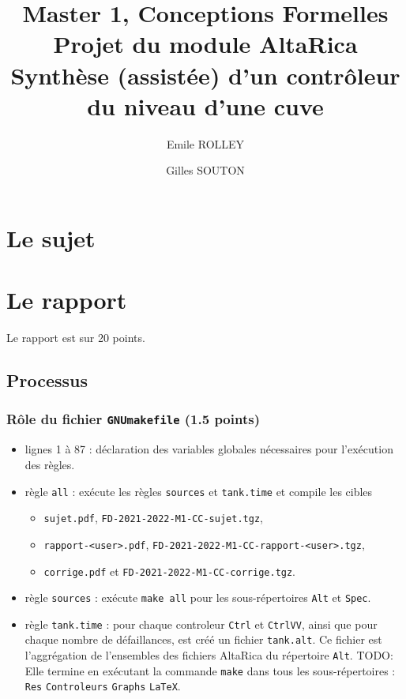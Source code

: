 \documentclass[a4paper]{book}
\newcommand{\altarica}{{\sc AltaRica}}
\begin{document}
\title{Master 1, Conceptions Formelles\\
Projet du module \altarica\\
Synthèse (assistée) d'un contrôleur du niveau d'une cuve}

\date{}

\author{Emile ROLLEY \and Gilles SOUTON}

\maketitle

\chapter{Le sujet}


\chapter{Le rapport}
Le rapport est sur 20 points.

\section{Processus}

\subsection{Rôle du fichier {\tt GNUmakefile} (1.5 points)}

\begin{itemize}
  \item lignes 1 à 87 : déclaration des variables globales nécessaires pour l'exécution des règles.
  \item règle \texttt{all} : exécute les règles \texttt{sources} et
    \texttt{tank.time} et compile les cibles
    \begin{itemize}
      \item \texttt{sujet.pdf}, \texttt{FD-2021-2022-M1-CC-sujet.tgz},
      \item \texttt{rapport-<user>.pdf}, \texttt{FD-2021-2022-M1-CC-rapport-<user>.tgz},
      \item \texttt{corrige.pdf} et \texttt{FD-2021-2022-M1-CC-corrige.tgz}.
    \end{itemize}
  \item règle \texttt{sources} : exécute \texttt{make all} pour les
    sous-répertoires \texttt{Alt} et \texttt{Spec}.
  \item règle \texttt{tank.time} : pour chaque controleur \texttt{Ctrl} et \texttt{CtrlVV},
    ainsi que pour chaque nombre de défaillances, est créé un fichier \texttt{tank.alt}.
    Ce fichier est l'aggrégation de l'ensembles des fichiers AltaRica du répertoire \texttt{Alt}.
    TODO:
    Elle termine en exécutant la commande \texttt{make} dans tous les
    sous-répertoires : \texttt{Res} \texttt{Controleurs} \texttt{Graphs}
    \texttt{LaTeX}.
\end{itemize}
\end{document}
